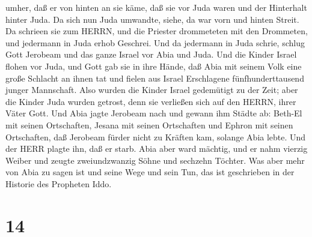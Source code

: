 umher, daß er von hinten an sie käme, daß sie vor Juda waren und der
Hinterhalt hinter Juda.  Da sich nun Juda umwandte, siehe,
da war vorn und hinten Streit. Da schrieen sie zum HERRN, und die
Priester drommeteten mit den Drommeten,  und jedermann in
Juda erhob Geschrei. Und da jedermann in Juda schrie, schlug Gott
Jerobeam und das ganze Israel vor Abia und Juda.  Und die
Kinder Israel flohen vor Juda, und Gott gab sie in ihre Hände,
 daß Abia mit seinem Volk eine große Schlacht an ihnen tat
und fielen aus Israel Erschlagene fünfhunderttausend junger Mannschaft.
 Also wurden die Kinder Israel gedemütigt zu der Zeit; aber
die Kinder Juda wurden getrost, denn sie verließen sich auf den HERRN,
ihrer Väter Gott.  Und Abia jagte Jerobeam nach und gewann
ihm Städte ab: Beth-El mit seinen Ortschaften, Jesana mit seinen
Ortschaften und Ephron mit seinen Ortschaften,  daß
Jerobeam fürder nicht zu Kräften kam, solange Abia lebte. Und der HERR
plagte ihn, daß er starb.  Abia aber ward mächtig, und er
nahm vierzig Weiber und zeugte zweiundzwanzig Söhne und sechzehn
Töchter.  Was aber mehr von Abia zu sagen ist und seine
Wege und sein Tun, das ist geschrieben in der Historie des Propheten
Iddo.

\hypertarget{section-13}{%
\section{14}\label{section-13}}

